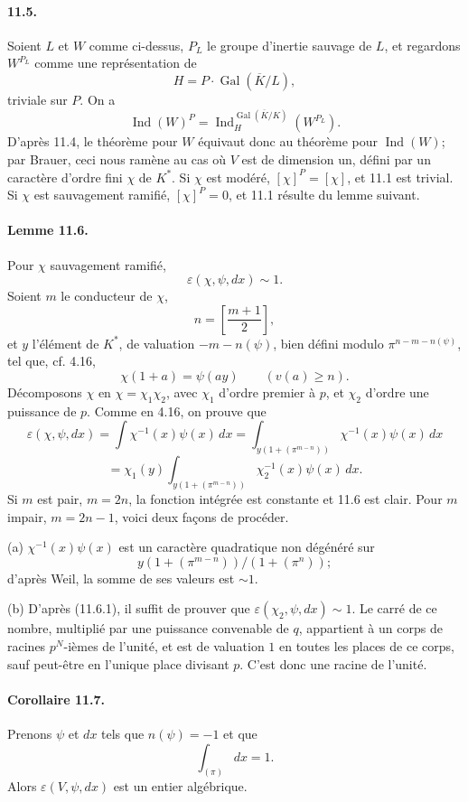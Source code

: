 \documentclass[10pt]{article}
\newcommand{\Gal}{\operatorname{Gal}}
\newcommand{\Ind}{\operatorname{Ind}}
\providecommand{\Gal}{\operatorname{Gal}}
\providecommand{\Gal}{\operatorname{Gal}}
\providecommand{\Gal}{\operatorname{Gal}}
\providecommand{\Gal}{\operatorname{Gal}}
\providecommand{\Ind}{\operatorname{Ind}}
\begin{document}
\paragraph{11.5.} Soient \(L\) et \(W\) comme ci-dessus, \(P_L\) le groupe d'inertie sauvage de \(L\), et regardons \(W^{P_L}\) comme une représentation de
\[
H=P\cdot\Gal(\overline K/L),
\]
triviale sur \(P\). On a
\[
\Ind(W)^P=\Ind_H^{\Gal(\overline K/K)}(W^{P_L}).
\]
D'après 11.4, le théorème pour \(W\) équivaut donc au théorème pour \(\Ind(W)\); par Brauer, ceci nous ramène au cas où \(V\) est de dimension un, défini par un caractère d'ordre fini \(\chi\) de \(K^*\). Si \(\chi\) est modéré, \([\chi]^P=[\chi]\), et 11.1 est trivial. Si \(\chi\) est sauvagement ramifié, \([\chi]^P=0\), et 11.1 résulte du lemme suivant.

\paragraph{Lemme 11.6.} Pour \(\chi\) sauvagement ramifié,
\[
\varepsilon(\chi,\psi,dx)\sim1.
\]
Soient \(m\) le conducteur de \(\chi\),
\[
n=\left[\frac{m+1}{2}\right],
\]
et \(y\) l'élément de \(K^*\), de valuation \(-m-n(\psi)\), bien défini modulo \(\pi^{n-m-n(\psi)}\), tel que, cf. 4.16,
\[
\chi(1+a)=\psi(ay)\qquad(v(a)\ge n).
\]
Décomposons \(\chi\) en \(\chi=\chi_1\chi_2\), avec \(\chi_1\) d'ordre premier à \(p\), et \(\chi_2\) d'ordre une puissance de \(p\). Comme en 4.16, on prouve que
\[
\tag{11.6.1}
\varepsilon(\chi,\psi,dx)
=
\int \chi^{-1}(x)\psi(x)\,dx
=
\int_{y(1+(\pi^{m-n}))}\chi^{-1}(x)\psi(x)\,dx
\]
\[
=
\chi_1(y)
\int_{y(1+(\pi^{m-n}))}\chi_2^{-1}(x)\psi(x)\,dx.
\]
Si \(m\) est pair, \(m=2n\), la fonction intégrée est constante et 11.6 est clair. Pour \(m\) impair, \(m=2n-1\), voici deux façons de procéder.

(a) \(\chi^{-1}(x)\psi(x)\) est un caractère quadratique non dégénéré sur
\[
y(1+(\pi^{m-n}))/(1+(\pi^n));
\]
d'après Weil, la somme de ses valeurs est \(\sim1\).

(b) D'après (11.6.1), il suffit de prouver que \(\varepsilon(\chi_2,\psi,dx)\sim1\). Le carré de ce nombre, multiplié par une puissance convenable de \(q\), appartient à un corps de racines \(p^N\)-ièmes de l'unité, et est de valuation \(1\) en toutes les places de ce corps, sauf peut-être en l'unique place divisant \(p\). C'est donc une racine de l'unité.

\paragraph{Corollaire 11.7.} Prenons \(\psi\) et \(dx\) tels que \(n(\psi)=-1\) et que
\[
\int_{(\pi)}dx=1.
\]
Alors \(\varepsilon(V,\psi,dx)\) est un entier algébrique.
\end{document}
